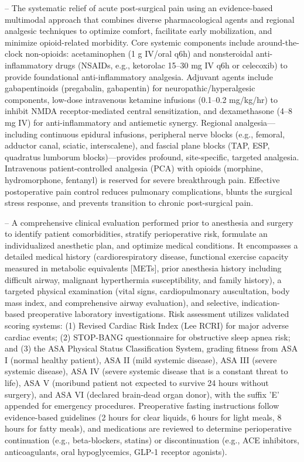 -- The systematic relief of acute post-surgical pain using an evidence-based multimodal approach that combines diverse pharmacological agents and regional analgesic techniques to optimize comfort, facilitate early mobilization, and minimize opioid-related morbidity. Core systemic components include around-the-clock non-opioids: acetaminophen (1 g IV/oral q6h) and nonsteroidal anti-inflammatory drugs (NSAIDs, e.g., ketorolac 15--30 mg IV q6h or celecoxib) to provide foundational anti-inflammatory analgesia. Adjuvant agents include gabapentinoids (pregabalin, gabapentin) for neuropathic/hyperalgesic components, low-dose intravenous ketamine infusions (0.1--0.2 mg/kg/hr) to inhibit NMDA receptor-mediated central sensitization, and dexamethasone (4--8 mg IV) for anti-inflammatory and antiemetic synergy. Regional analgesia—including continuous epidural infusions, peripheral nerve blocks (e.g., femoral, adductor canal, sciatic, interscalene), and fascial plane blocks (TAP, ESP, quadratus lumborum blocks)—provides profound, site-specific, targeted analgesia. Intravenous patient-controlled analgesia (PCA) with opioids (morphine, hydromorphone, fentanyl) is reserved for severe breakthrough pain. Effective postoperative pain control reduces pulmonary complications, blunts the surgical stress response, and prevents transition to chronic post-surgical pain.

-- A comprehensive clinical evaluation performed prior to anesthesia and surgery to identify patient comorbidities, stratify perioperative risk, formulate an individualized anesthetic plan, and optimize medical conditions. It encompasses a detailed medical history (cardiorespiratory disease, functional exercise capacity measured in metabolic equivalents [METs], prior anesthesia history including difficult airway, malignant hyperthermia susceptibility, and family history), a targeted physical examination (vital signs, cardiopulmonary auscultation, body mass index, and comprehensive airway evaluation), and selective, indication-based preoperative laboratory investigations. Risk assessment utilizes validated scoring systems: (1) Revised Cardiac Risk Index (Lee RCRI) for major adverse cardiac events; (2) STOP-BANG questionnaire for obstructive sleep apnea risk; and (3) the ASA Physical Status Classification System, grading fitness from ASA I (normal healthy patient), ASA II (mild systemic disease), ASA III (severe systemic disease), ASA IV (severe systemic disease that is a constant threat to life), ASA V (moribund patient not expected to survive 24 hours without surgery), and ASA VI (declared brain-dead organ donor), with the suffix 'E' appended for emergency procedures. Preoperative fasting instructions follow evidence-based guidelines (2 hours for clear liquids, 6 hours for light meals, 8 hours for fatty meals), and medications are reviewed to determine perioperative continuation (e.g., beta-blockers, statins) or discontinuation (e.g., ACE inhibitors, anticoagulants, oral hypoglycemics, GLP-1 receptor agonists).

